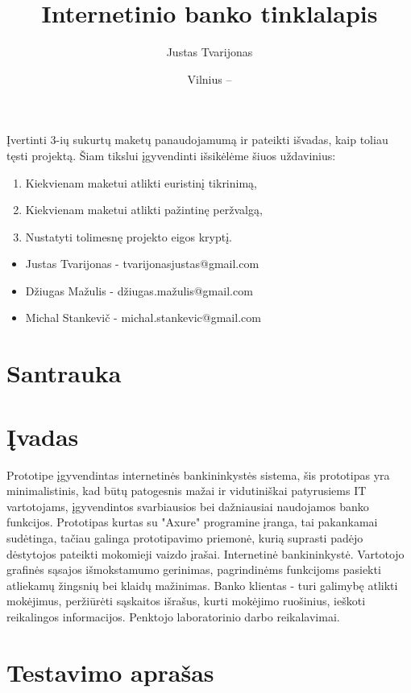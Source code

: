 \documentclass[oneside]{VUMIFPSkursinis}
\title{Internetinio banko tinklalapis}
\author{Justas Tvarijonas}
\date{Vilnius – \the\year}
\begin{document}
\maketitle
{}
Įvertinti 3-ių sukurtų maketų panaudojamumą ir pateikti išvadas, kaip toliau tęsti projektą. Šiam tikslui įgyvendinti išsikėlėme šiuos uždavinius:
\begin{enumerate}
	\item Kiekvienam maketui atlikti euristinį tikrinimą,
	\item Kiekvienam maketui atlikti pažintinę peržvalgą,
	\item Nustatyti tolimesnę projekto eigos kryptį.
\end{enumerate}
\begin{itemize}
	\item Justas Tvarijonas - tvarijonasjustas@gmail.com
	\item Džiugas Mažulis - džiugas.mažulis@gmail.com
	\item Michal Stankevič - michal.stankevic@gmail.com 
\end{itemize}
\tableofcontents
\section{Santrauka}
\section{Įvadas}
Prototipe įgyvendintas internetinės bankininkystės sistema, šis prototipas yra minimalistinis, kad būtų patogesnis mažai ir vidutiniškai patyrusiems IT vartotojams, įgyvendintos svarbiausios bei dažniausiai naudojamos banko funkcijos.
Prototipas kurtas su "Axure" programine įranga, tai pakankamai sudėtinga, tačiau galinga prototipavimo priemonė, kurią suprasti padėjo dėstytojos pateikti mokomieji vaizdo įrašai.
Internetinė bankininkystė.
Vartotojo grafinės sąsajos išmokstamumo gerinimas, pagrindinėms funkcijoms pasiekti atliekamų žingsnių bei klaidų mažinimas.
Banko klientas - turi galimybę atlikti mokėjimus, peržiūrėti sąskaitos išrašus, kurti mokėjimo ruošinius, ieškoti reikalingos informacijos.
Penktojo laboratorinio darbo reikalavimai.
\section{Testavimo aprašas}
\end{document}

